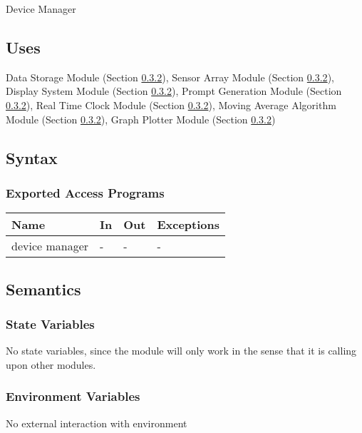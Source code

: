 \documentclass[12pt, titlepage]{article}
\begin{document}
Device Manager 

\subsection{Uses}

Data Storage Module (Section \ref{}), Sensor Array Module (Section \ref{}), Display System Module (Section \ref{}), Prompt Generation Module (Section \ref{}), Real Time Clock Module (Section \ref{}), Moving Average Algorithm Module (Section \ref{}), Graph Plotter Module (Section \ref{})

\subsection{Syntax}

\subsubsection{Exported Access Programs}

\begin{center}
\begin{tabular}{p{2cm} p{4cm} p{4cm} p{2cm}}
\hline
\textbf{Name} & \textbf{In} & \textbf{Out} & \textbf{Exceptions} \\
\hline
device manager & - & - & - \\
\hline
\end{tabular}
\end{center}

\subsection{Semantics}

\subsubsection{State Variables}


No state variables, since the module will only work in the sense that it is calling upon other modules. 

\subsubsection{Environment Variables}

No external interaction with environment
\end{document}
